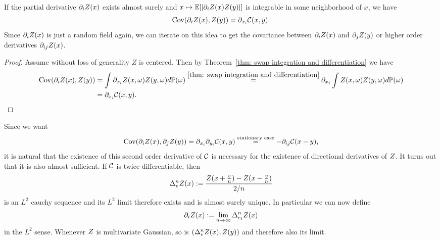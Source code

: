 \begin{lemma}
	\label{lem: covariance of derivative}
	If the partial derivative \(\partial_iZ(x)\) exists almost surely and
	\(x\mapsto\mathbb{E}[|\partial_iZ(x)Z(y)|]\) is integrable in some neighborhood of
	\(x\), we have
	\begin{equation*}
		\operatorname{Cov}(\partial_iZ(x), Z(y)) = \partial_{x_i} \mathcal{C}(x,y).
	\end{equation*}
	Since \(\partial_iZ(x)\) is just a random field again, we can iterate
	on this idea to get the covariance between \(\partial_iZ(x)\) and
	\(\partial_jZ(y)\) or higher order derivatives \(\partial_{ij}Z(x)\).
\end{lemma}
\begin{proof}
	Assume without loss of generality \(Z\) is centered. Then by
	Theorem~\ref{thm: swap integration and differentiation} we have
	\begin{align*}
		\operatorname{Cov}(\partial_i Z(x), Z(y))
		&= \int \partial_{x_i}Z(x,\omega) Z(y,\omega) d\mathbb{P}(\omega)
		\overset{\ref{thm: swap integration and differentiation}}= \partial_{x_i} \int Z(x,\omega) Z(y,\omega) d\mathbb{P}(\omega)\\
		&= \partial_{x_i} \mathcal{C}(x,y).
		\qedhere
	\end{align*}
\end{proof}
Since we want
\[
	\operatorname{Cov}(\partial_i Z(x), \partial_jZ(y)) = \partial_{x_i}\partial_{y_i}\mathcal{C}(x,y)
	\overset{\text{stationary case}}= -\partial_{ij}\mathcal{C}(x-y),
\]
it is natural that the existence of this second order derivative of \(\mathcal{C}\) is
necessary for the existence of directional derivatives of \(Z\). It turns out
that it is also almost sufficient. If \(\mathcal{C}\) is twice differentiable, then
\[
	\Delta_v^n Z(x)	:= \frac{Z(x+\frac{v}n)-Z(x-\frac{v}n)}{2/n}
\]
is an \(L^2\) cauchy sequence and its \(L^2\) limit therefore exists and is
almost surely unique. In particular we can now define
\[
	\partial_iZ(x):=\lim_{n\to\infty} \Delta_{e_i}^nZ(x)
\]
in the \(L^2\) sense. Whenever \(Z\) is multivariate
Gaussian, so is \((\Delta_v^n Z(x), Z(y))\) and therefore also its limit.

